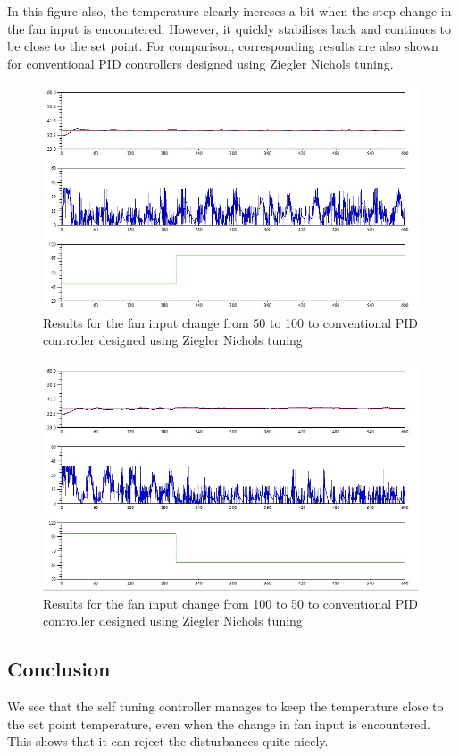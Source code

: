 In this figure also, the temperature clearly increses a bit when the step change in the fan input is encountered. However, 
it quickly stabilises back and continues to be close to the set point.
\newpage
For comparison, corresponding results are also shown for conventional PID controllers designed using Ziegler Nichols tuning.
\begin{figure}[h]
	\centering
\includegraphics[width=.75\linewidth]{Vikas_self/report_tex/PID_results/Conventional_Tuning/Fan_disturbance/PID/step50to100.jpg}
	\caption{Results for the fan input change from 50 to 100 to conventional PID controller designed using Ziegler Nichols tuning}
	
\end{figure}

\begin{figure}[h]
	\centering
\includegraphics[width=.75\linewidth]{Vikas_self/report_tex/PID_results/Conventional_Tuning/Fan_disturbance/PID/step100to50.jpg}
	\caption{Results for the fan input change from 100 to 50 to conventional PID controller designed using Ziegler Nichols tuning}
	
\end{figure}

\subsection{Conclusion}
We see that the self tuning controller manages to keep the temperature close to the set point temperature, even when the 
change in fan input is encountered. This shows that it can reject the disturbances quite nicely.

